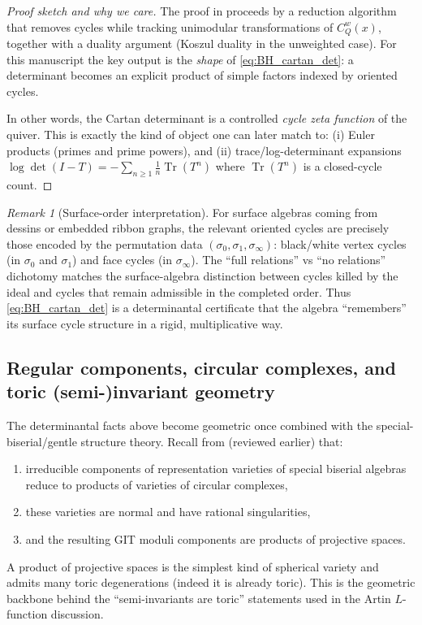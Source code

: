 \documentclass[11pt,oneside]{amsbook}
\numberwithin{equation}{section}
\theoremstyle{plain}
\theoremstyle{definition}
\theoremstyle{remark}
\newtheorem{remark}[theorem]{Remark}
\DeclareMathOperator{\Tr}{\mathrm{Tr}}
\begin{document}
\begin{proof}[Proof sketch and why we care]
The proof in \cite{BessenrodtHolm2005WeightedLocallyGentle} proceeds by a reduction algorithm that removes cycles while tracking unimodular transformations of $C_Q^w(x)$, together with a duality argument (Koszul duality in the unweighted case).
For this manuscript the key output is the \emph{shape} of \eqref{eq:BH_cartan_det}:
a determinant becomes an explicit product of simple factors indexed by oriented cycles.

In other words, the Cartan determinant is a controlled \emph{cycle zeta function} of the quiver.
This is exactly the kind of object one can later match to:
(i) Euler products (primes and prime powers), and
(ii) trace/log-determinant expansions $\log\det(I-T)=-\sum_{n\ge 1}\frac{1}{n}\Tr(T^n)$ where $\Tr(T^n)$ is a closed-cycle count.
\end{proof}

\begin{remark}[Surface-order interpretation]
For surface algebras coming from dessins or embedded ribbon graphs, the relevant oriented cycles are precisely those encoded by the permutation data $(\sigma_0,\sigma_1,\sigma_\infty)$:
black/white vertex cycles (in $\sigma_0$ and $\sigma_1$) and face cycles (in $\sigma_\infty$).
The ``full relations'' vs ``no relations'' dichotomy matches the surface-algebra distinction between cycles killed by the ideal and cycles that remain admissible in the completed order.
Thus \eqref{eq:BH_cartan_det} is a determinantal certificate that the algebra ``remembers'' its surface cycle structure in a rigid, multiplicative way.
\end{remark}

\subsection{Regular components, circular complexes, and toric (semi-)invariant geometry}
\label{sec:regular_components_toric}

The determinantal facts above become geometric once combined with the special-biserial/gentle structure theory.
Recall from \cite{CarrollChindrisKinserWeyman2018ModuliSpecialBiserial} (reviewed earlier) that:
\begin{enumerate}[label=(\roman*)]
\item irreducible components of representation varieties of special biserial algebras reduce to products of varieties of circular complexes,
\item these varieties are normal and have rational singularities,
\item and the resulting GIT moduli components are products of projective spaces.
\end{enumerate}
A product of projective spaces is the simplest kind of spherical variety and admits many toric degenerations (indeed it is already toric).
This is the geometric backbone behind the ``semi-invariants are toric'' statements used in the Artin $L$-function discussion.
\end{document}
